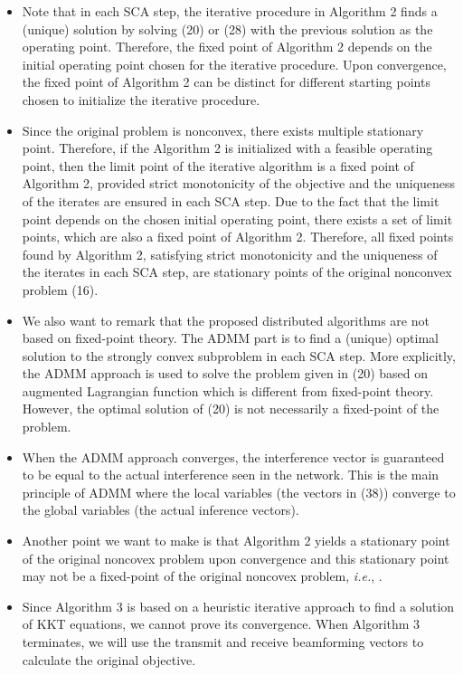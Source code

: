 \begin{enumerate}
\begin{itemize}
\item Note that in each \ac{SCA} step, the iterative procedure in Algorithm 2 finds a (unique) solution by solving (20) or (28) with the previous solution as the operating point. Therefore, the fixed point of Algorithm 2 depends on the initial operating point chosen for the iterative procedure. Upon convergence, the fixed point of Algorithm 2 can be distinct for different starting points chosen to initialize the iterative procedure.

\item Since the original problem is nonconvex, there exists multiple stationary point. Therefore, if the Algorithm 2 is initialized with a feasible operating point, then the limit point of the iterative algorithm is a fixed point of Algorithm 2, provided strict monotonicity of the objective and the uniqueness of the iterates are ensured in each \ac{SCA} step. Due to the fact that the limit point depends on the chosen initial operating point, there exists a set of limit points, which are also a fixed point of Algorithm 2. Therefore, all fixed points found by Algorithm 2, satisfying strict monotonicity and the uniqueness of the iterates in each \ac{SCA} step, are stationary points of the original nonconvex problem (16).

\item We also want to remark that  the proposed distributed algorithms are not based on fixed-point theory. The \ac{ADMM} part is to find a (unique) optimal solution to the strongly convex subproblem in each \ac{SCA} step. More explicitly, the \ac{ADMM} approach is used to solve the problem given in (20) based on augmented Lagrangian function which is different from fixed-point theory. However, the optimal solution of (20) is not necessarily a fixed-point of the problem. 

\item When the ADMM approach converges, the interference vector is guaranteed to be equal to the actual interference seen in the network. This is the main principle of \ac{ADMM} where the local variables (the vectors in (38)) converge to the global variables (the actual inference vectors).

\item Another point we want to make is that Algorithm 2 yields a stationary point of the original noncovex problem upon convergence and this stationary point may not be a fixed-point of the original noncovex problem, \textit{i.e.}, . 

\item Since Algorithm 3 is based on a heuristic iterative approach to find a solution of \ac{KKT} equations, we cannot prove its convergence. When Algorithm 3 terminates, we will use the transmit and receive beamforming vectors to calculate the original objective.


\end{itemize}
\end{enumerate}
